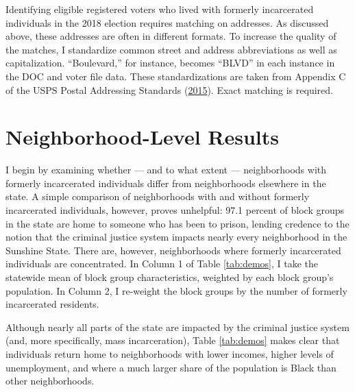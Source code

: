 \documentclass[
  12pt,
]{article}
\begin{document}
Identifying eligible registered voters who lived with formerly incarcerated individuals in the 2018 election requires matching on addresses. As discussed above, these addresses are often in different formats. To increase the quality of the matches, I standardize common street and address abbreviations as well as capitalization. ``Boulevard,'' for instance, becomes ``BLVD'' in each instance in the DOC and voter file data. These standardizations are taken from Appendix C of the USPS Postal Addressing Standards (\protect\hyperlink{ref-USPS2015}{2015}). Exact matching is required.

\hypertarget{neighborhood-level-results}{%
\section*{Neighborhood-Level Results}\label{neighborhood-level-results}}

I begin by examining whether --- and to what extent --- neighborhoods with formerly incarcerated individuals differ from neighborhoods elsewhere in the state. A simple comparison of neighborhoods with and without formerly incarcerated individuals, however, proves unhelpful: 97.1 percent of block groups in the state are home to someone who has been to prison, lending credence to the notion that the criminal justice system impacts nearly every neighborhood in the Sunshine State. There are, however, neighborhoods where formerly incarcerated individuals are concentrated. In Column 1 of Table \ref{tab:demos}, I take the statewide mean of block group characteristics, weighted by each block group's population. In Column 2, I re-weight the block groups by the number of formerly incarcerated residents.



Although nearly all parts of the state are impacted by the criminal justice system (and, more specifically, mass incarceration), Table \ref{tab:demos} makes clear that individuals return home to neighborhoods with lower incomes, higher levels of unemployment, and where a much larger share of the population is Black than other neighborhoods.
\end{document}
